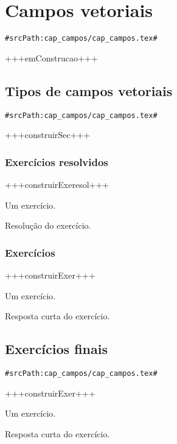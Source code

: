 
\chapter{Campos vetoriais}
\verb+#srcPath:cap_campos/cap_campos.tex#+
\label{cap:campos}

+++emConstrucao+++

\section{Tipos de campos vetoriais}
\verb+#srcPath:cap_campos/cap_campos.tex#+


+++construirSec+++

\subsection*{Exercícios resolvidos}

+++construirExeresol+++

\begin{exeresol}
  Um exercício.
\end{exeresol}
\begin{resol}
  Resolução do exercício.
\end{resol}

\subsection*{Exercícios}

+++construirExer+++

\begin{exer}
  Um exercício.
\end{exer}
\begin{resp}
  Resposta curta do exercício.
\end{resp}

\section{Exercícios finais}
\verb+#srcPath:cap_campos/cap_campos.tex#+


+++construirExer+++

\begin{exer}
  Um exercício.
\end{exer}
\begin{resp}
  Resposta curta do exercício.
\end{resp}

